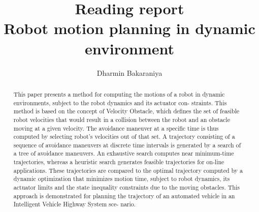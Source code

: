 \documentclass[12pt]{article}
\title{Reading report \\Robot motion planning in dynamic environment \cite{fiorini} }
\author{Dharmin Bakaraniya}
\begin{document}
\maketitle{}
\begin{abstract}
This paper presents a method for computing the
motions of a robot in dynamic environments, subject to the robot dynamics and its actuator con-
straints. This method is based on the concept of
Velocity Obstacle, which defines the set of feasible robot velocities that would result in a collision
between the robot and an obstacle moving at a
given velocity. The avoidance maneuver at a specific time is thus computed by selecting robot's
velocities out of that set. A trajectory consisting
of a sequence of avoidance maneuvers at discrete
time intervals is generated by a search of a tree of
avoidance maneuvers. An exhaustive search computes near minimum-time trajectories, whereas
a heuristic search generates feasible trajectories
for on-line applications. These trajectories are
compared to the optimal trajectory computed by
a dynamic optimization that minimizes motion
time, subject to robot dynamics, its actuator limits and the state inequality constraints due to the
moving obstacles. This approach is demonstrated
for planning the trajectory of an automated vehicle in an Intelligent Vehicle Highway System sce-
nario.
\end{abstract}
\end{document}
